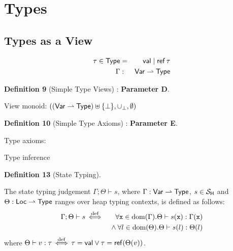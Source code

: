 \section{Types}\label{sec:types}

\subsection{Types as a View}

\begin{eqnarray*}
  \tau \in \mathsf{Type} &=& \mathsf{val} \mid \mathop{\mathsf{ref}} \tau
\\ \Gamma &:& \mathsf{Var} \rightharpoonup \mathsf{Type}
\end{eqnarray*}

\textbf{Definition 9} (Simple Type Views) : \textbf{Parameter D}.

View monoid: $((\mathsf{Var} \rightharpoonup \mathsf{Type})\uplus\{\bot\},\cup_\bot,\emptyset)$

\textbf{Definition 10} (Simple Type Axioms) : \textbf{Parameter E}.

Type axioms:

\def\op{\mathbin{\mathsf{op}}}
Type inference

\textbf{Definition 13} (State Typing).

The state typing judgement $\Gamma;\Theta \vdash s$,
where $\Gamma : \mathsf{Var} \rightharpoonup \mathsf{Type}$, $s \in \mathcal{S}_{\mathsf{H}}$
and $\Theta : \mathsf{Loc} \rightharpoonup \mathsf{Type}$ ranges
over heap typing contexts, is defined as follows:
\begin{eqnarray*}
   \Gamma;\Theta \vdash s
   &\mathrel{\stackrel{\mathrm{def}}{\,\Leftarrow\!\Rightarrow\,}}&
   \forall \mathtt{x} \in \mathrm{dom}(\Gamma) . \Theta \vdash s(\mathtt{x}) : \Gamma(\mathtt{x})
\\ && {} \land \forall l \in \mathrm{dom}(\Theta) . \Theta \vdash s(l) : \Theta(l)
\end{eqnarray*}
where $\Theta \vdash v : \tau \mathrel{\stackrel{\mathrm{def}}{\,\Leftarrow\!\Rightarrow\,}} \tau=\mathsf{val} \lor \tau=\mathop{\mathsf{ref}} (\Theta(v))$.


